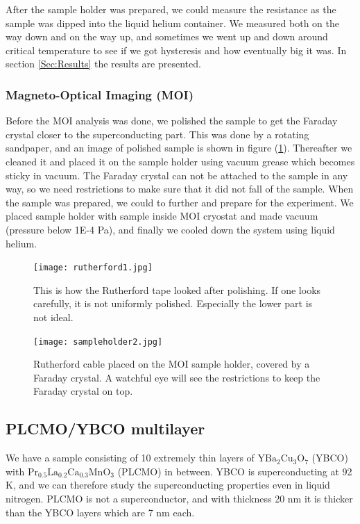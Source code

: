 \documentclass{comjnl}
\newcommand*\chem[1]{\ensuremath{\mathrm{#1}}}
\begin{document}
After the sample holder was prepared, we could measure the resistance as the sample was dipped into the liquid helium container. We measured both on the way down and on the way up, and sometimes we went up and down around critical temperature to see if we got hysteresis and how eventually big it was. In section \ref{Sec:Results} the results are presented.

\subsubsection{Magneto-Optical Imaging (MOI)}
Before the MOI analysis was done, we polished the sample to get the Faraday crystal closer to the superconducting part. This was done by a rotating sandpaper, and an image of polished sample is shown in figure (\ref{fig:rutherford1}). Thereafter we cleaned it and placed it on the sample holder using vacuum grease which becomes sticky in vacuum. The Faraday crystal can not be attached to the sample in any way, so we need restrictions to make sure that it did not fall of the sample. When the sample was prepared, we could to further and prepare for the experiment. We placed sample holder with sample inside MOI cryostat and made vacuum (pressure below 1E-4 Pa), and finally we cooled down the system using liquid helium.
\begin{figure}[h]
\centering
\texttt{[image: rutherford1.jpg]}
\caption{This is how the Rutherford tape looked after polishing. If one looks carefully, it is not uniformly polished. Especially the lower part is not ideal. \label{fig:rutherford1}}
\end{figure}
\begin{figure}[h]
\centering
\texttt{[image: sampleholder2.jpg]}
\caption{Rutherford cable placed on the MOI sample holder, covered by a Faraday crystal. A watchful eye will see the restrictions to keep the Faraday crystal on top. \label{fig:sampleholder2}}
\end{figure}

\subsection{PLCMO/YBCO multilayer}
We have a sample consisting of 10 extremely thin layers of \chem{YBa_2Cu_3O_7} (YBCO) with \chem{Pr_{0.5}La_{0.2}Ca_{0.3}MnO_3} (PLCMO) in between. YBCO is superconducting at 92 K, and we can therefore study the superconducting properties even in liquid nitrogen. PLCMO is not a superconductor, and with thickness 20 nm it is thicker than the YBCO layers which are 7 nm each. 
\end{document}
